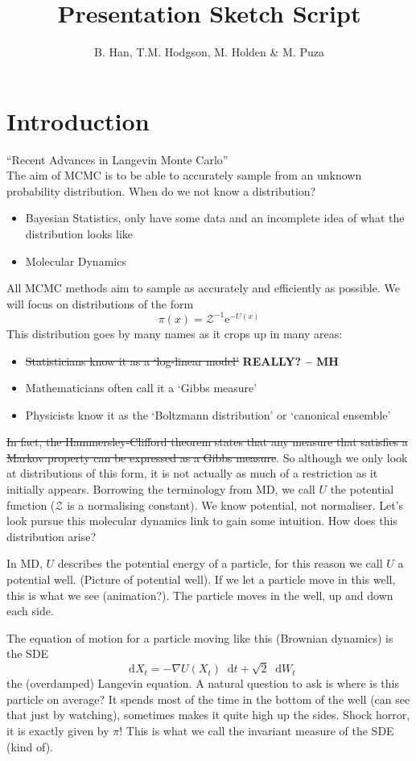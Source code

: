 \documentclass[a4paper]{article}
\title{Presentation Sketch Script}
\author{B. Han, T.M. Hodgson, M. Holden \& M. Puza}
\newcommand{\dif}{\mathop{}\!\mathrm{d}}
\newcommand{\e}{\mathrm{e}}
\newcommand{\grad}{\nabla}
\begin{document}
\maketitle
\section{Introduction}
``Recent Advances in Langevin Monte Carlo'' \\
The aim of MCMC is to be able to accurately sample from an unknown probability distribution. When do we not know a distribution?
 \begin{itemize}
     \item Bayesian Statistics, only have some data and an incomplete idea of what the distribution looks like
     \item Molecular Dynamics
 \end{itemize}
 All MCMC methods aim to sample as accurately and efficiently as possible. We will focus on distributions of the form 
 \[\pi(x) = \mathcal{Z}^{-1} \e^{-U(x)}\]
 This distribution goes by many names as it crops up in many areas:
 \begin{itemize}
     \item \st{Statisticians know it as a `log-linear model'} \textbf{REALLY? -- MH}
     \item Mathematicians often call it a `Gibbs measure'
     \item Physicists know it as the `Boltzmann distribution' or `canonical ensemble'
 \end{itemize}
 \st{In fact, the Hammersley-Clifford theorem states that any measure that satisfies a Markov property can be expressed as a Gibbs measure}. So although we only look at distributions of this form, it is not actually as much of a restriction as it initially appears. Borrowing the terminology from MD, we call \(U\) the potential function (\(\mathcal{Z}\) is a normalising constant). We know potential, not normaliser. Let's look pursue this molecular dynamics link to gain some intuition. How does this distribution arise?
 
 In MD, \(U\) describes the potential energy of a particle, for this reason we call \(U\) a potential well. (Picture of potential well). If we let a particle move in this well, this is what we see (animation?). The particle moves in the well, up and down each side. 
 
 The equation of motion for a particle moving like this (Brownian dynamics) is the SDE
 \[\dif X_t = -\grad U(X_t) \dif t +\sqrt{2}\dif W_t\]
 the (overdamped) Langevin equation. A natural question to ask is where is this particle on average? It spends most of the time in the bottom of the well (can see that just by watching), sometimes makes it quite high up the sides. Shock horror, it is exactly given by \(\pi\)! This is what we call the invariant measure of the SDE (kind of).
\end{document}
